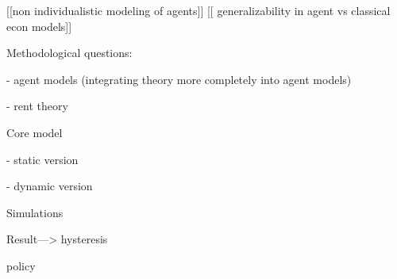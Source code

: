 [[non individualistic modeling of agents]] 
[[ generalizability in agent vs classical econ models]]

Methodological questions: 

    - agent models (integrating theory more completely into agent models)
    
    - rent theory

Core model

    - static version
    
    - dynamic version

Simulations

Result---> hysteresis

policy